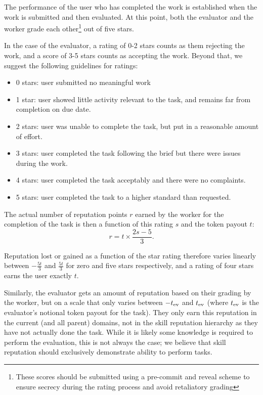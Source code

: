 The performance of the user who has completed the work is established when the work is submitted and then evaluated. At this point, both the evaluator and the worker grade each other\footnote{These scores should be submitted using a pre-commit and reveal scheme to ensure secrecy during the rating process and avoid retaliatory grading} out of five stars.

In the case of the evaluator, a rating of 0-2 stars counts as them rejecting the work, and a score of 3-5 stars counts as accepting the work. Beyond that, we suggest the following guidelines for ratings:
\begin{itemize}
 \item[] 0 stars: user submitted no meaningful work 
 \item[]1 star:\phantom{s} user showed little activity relevant to the task, and remains far from completion on due date.
 \item[]2 stars: user was unable to complete the task, but put in a reasonable amount of effort.
 \item[]3 stars: user completed the task following the brief but there were issues during the work.
 \item[]4 stars: user completed the task acceptably and there were no complaints.
 \item[]5 stars: user completed the task to a higher standard than requested.
\end{itemize}

The actual number of reputation points $r$ earned by the worker for the completion of the task is then a function of this rating $s$ and the token payout $t$:
\begin{equation*}\label{eq:stars-to-rep}
 r = t \times \frac{2s - 5}{3}.
\end{equation*}
 
Reputation lost or gained as a function of the star rating therefore varies linearly between $-\frac{5t}{3}$ and $\frac{5t}{3}$ for zero and five stars respectively, and a rating of four stars earns the user exactly $t$. 

Similarly, the evaluator gets an amount of reputation based on their grading by the worker, but on a scale that only varies between $-t_{\rm ev}$ and $t_{\rm ev}$ (where $t_{\rm ev}$ is the evaluator's notional token payout for the task). They only earn this reputation in the current (and all parent) domains, not in the skill reputation hierarchy as they have not actually done the task. While it is likely some knowledge is required to perform the evaluation, this is not always the case; we believe that skill reputation should exclusively demonstrate ability to perform tasks.

